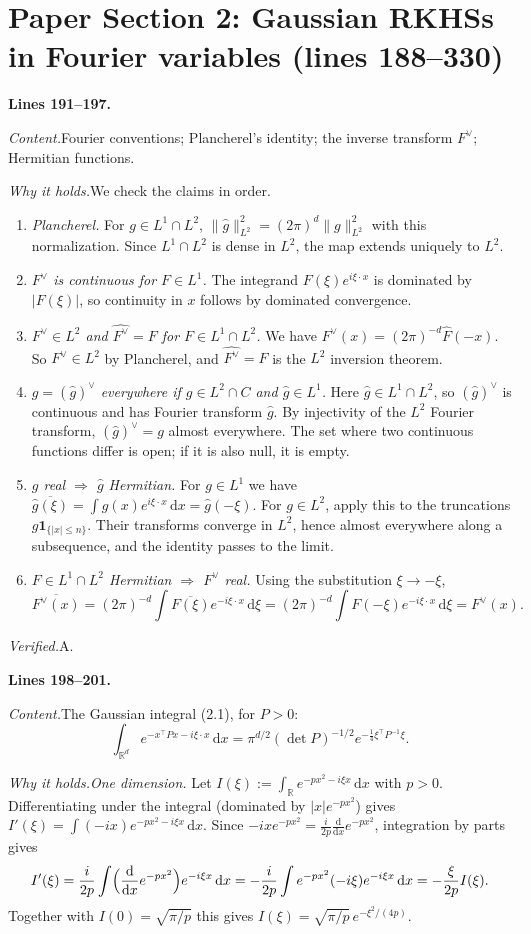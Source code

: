 \documentclass[11pt]{amsart}
\newcommand{\R}{\mathbb{R}}
\newcommand{\dd}{\,\mathrm{d}}
\newcommand{\hatf}[1]{\widehat{#1}}
\newcommand{\tp}{\top}
\newcommand{\src}[1]{\par\bigskip\noindent\textbf{Lines #1.}\enspace}
\newcommand{\content}{\par\smallskip\noindent\textit{Content.}\enspace}
\newcommand{\why}{\par\smallskip\noindent\textit{Why it holds.}\enspace}
\newcommand{\verified}{\par\smallskip\noindent\textit{Verified.}\enspace}
\newcommand{\tA}{\textsf{A}}
\begin{document}
\section{Paper Section 2: Gaussian RKHSs in Fourier variables (lines 188--330)}\label{sec:fourier}

\src{191--197}
\content Fourier conventions; Plancherel's identity; the inverse transform $F^\vee$; Hermitian functions.
\why We check the claims in order.
\begin{enumerate}
\item \emph{Plancherel.} For $g\in L^1\cap L^2$, $\|\hatf g\|_{L^2}^2=(2\pi)^d\|g\|_{L^2}^2$ with this
normalization. Since $L^1\cap L^2$ is dense in $L^2$, the map extends uniquely to $L^2$.
\item \emph{$F^\vee$ is continuous for $F\in L^1$.} The integrand $F(\xi)e^{i\xi\cdot x}$ is dominated by $|F(\xi)|$,
so continuity in $x$ follows by dominated convergence.
\item \emph{$F^\vee\in L^2$ and $\hatf{F^\vee}=F$ for $F\in L^1\cap L^2$.} We have $F^\vee(x)=(2\pi)^{-d}\hatf
F(-x)$. So $F^\vee\in L^2$ by Plancherel, and $\hatf{F^\vee}=F$ is the $L^2$ inversion theorem.
\item \emph{$g=(\hatf g)^\vee$ everywhere if $g\in L^2\cap C$ and $\hatf g\in L^1$.} Here $\hatf g\in L^1\cap L^2$,
so $(\hatf g)^\vee$ is continuous and has Fourier transform $\hatf g$. By injectivity of the $L^2$ Fourier transform,
$(\hatf g)^\vee=g$ almost everywhere. The set where two continuous functions differ is open; if it is also null, it
is empty.
\item \emph{$g$ real $\Rightarrow$ $\hatf g$ Hermitian.} For $g\in L^1$ we have
$\overline{\hatf g(\xi)}=\int g(x)e^{i\xi\cdot x}\dd x=\hatf g(-\xi)$. For $g\in L^2$, apply this to the truncations
$g\mathbf 1_{\{|x|\le n\}}$. Their transforms converge in $L^2$, hence almost everywhere along a subsequence, and the
identity passes to the limit.
\item \emph{$F\in L^1\cap L^2$ Hermitian $\Rightarrow$ $F^\vee$ real.} Using the substitution $\xi\to-\xi$,
\[
\overline{F^\vee(x)}=(2\pi)^{-d}\int\overline{F(\xi)}e^{-i\xi\cdot x}\dd\xi
=(2\pi)^{-d}\int F(-\xi)e^{-i\xi\cdot x}\dd\xi=F^\vee(x).
\]
\end{enumerate}
\verified \tA.

\src{198--201}
\content The Gaussian integral (2.1), for $P>0$:
\[
\int_{\R^d}e^{-x^\tp Px-i\xi\cdot x}\dd x=\pi^{d/2}(\det P)^{-1/2}e^{-\frac14\xi^\tp P^{-1}\xi}.
\]
\why \emph{One dimension.} Let $I(\xi):=\int_\R e^{-px^2-i\xi x}\dd x$ with $p>0$. Differentiating under the integral
(dominated by $|x|e^{-px^2}$) gives $I'(\xi)=\int(-ix)e^{-px^2-i\xi x}\dd x$. Since
$-ixe^{-px^2}=\frac{i}{2p}\frac{\mathrm d}{\mathrm dx}e^{-px^2}$, integration by parts gives
\[
I'(\xi)=\frac{i}{2p}\int\Bigl(\frac{\mathrm d}{\mathrm dx}e^{-px^2}\Bigr)e^{-i\xi x}\dd x
=-\frac{i}{2p}\int e^{-px^2}(-i\xi)e^{-i\xi x}\dd x=-\frac{\xi}{2p}I(\xi).
\]
Together with $I(0)=\sqrt{\pi/p}$ this gives $I(\xi)=\sqrt{\pi/p}\,e^{-\xi^2/(4p)}$.
\end{document}
